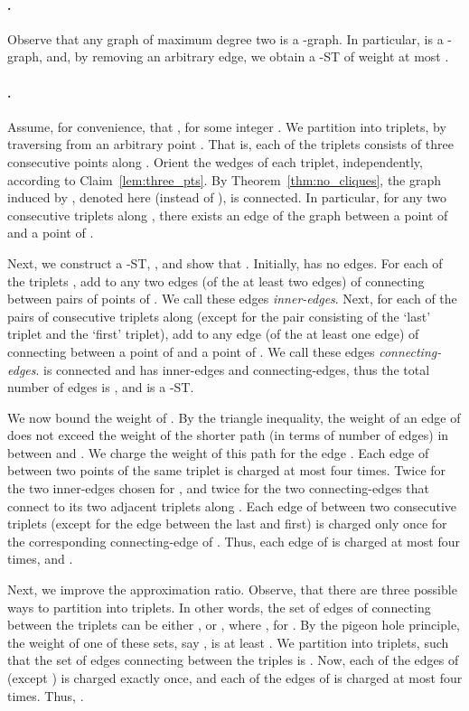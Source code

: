 \documentclass[11pt]{article}
\begin{document}
\paragraph{.}
Observe that any graph of maximum degree two is a -graph. In particular,  is a -graph, and, by removing an arbitrary edge, we obtain a -ST of weight at most .

\paragraph{.}
Assume, for convenience, that , for some integer .
We partition  into  triplets, by traversing  from an arbitrary point .
That is, each of the triplets consists of three consecutive points along .
Orient the wedges of each triplet, independently, according to Claim~\ref{lem:three_pts}.
By Theorem~\ref{thm:no_cliques}, the graph induced by , denoted here  (instead of ), is connected. In particular, for any two consecutive triplets  along , there exists an edge of the graph between a point of  and a point of .

Next, we construct a -ST, , and show that .
Initially,  has no edges. For each of the  triplets , add to  any two edges (of the at least two edges) of  connecting between pairs of points of . We call these edges {\em inner-edges}. Next, for each of the  pairs of consecutive triplets  along  (except for the pair consisting of the `last' triplet and the `first' triplet), add to  any edge (of the at least one edge) of  connecting between a point of  and a point of . We call these edges {\em connecting-edges}.
 is connected and has  inner-edges and  connecting-edges, thus the total number of edges is , and  is a -ST. 

We now bound the weight of . By the triangle inequality, the weight of an edge  of  does not exceed the weight of the shorter path (in terms of number of edges) in  between  and . We charge the weight of this path for the edge .
Each edge of  between two points of the same triplet  is charged at most four times. Twice for the two inner-edges chosen for , and twice for the two connecting-edges that connect  to its two adjacent triplets along .
Each edge of  between two consecutive triplets  (except for the edge between the last and first) is charged only once for the corresponding connecting-edge of . 
Thus, each edge of  is charged at most four times, and .

Next, we improve the approximation ratio. Observe, that there are three possible ways to partition  into  triplets.
In other words, the set of edges of  connecting between the triplets can be either , or , where
, for . By the pigeon hole principle, the weight of one of these sets, say , is at least . We partition  into triplets, such that the set of edges connecting between the triples is . Now, each of the edges of  (except ) is charged exactly once, and each of the edges of  is charged at most four times. Thus, 
.
\end{document}
